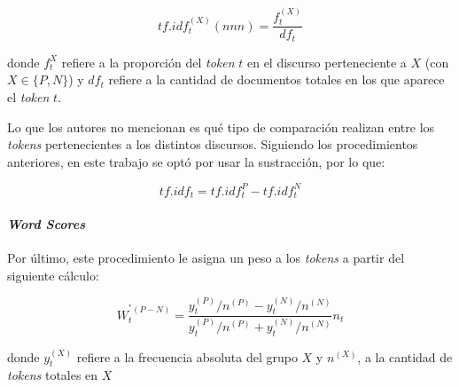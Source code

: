 \begin{equation}
\label{equation-tfidf-nnn}
    tf.idf_{t}^{(X)}(nnn) = \frac{f_{t}^{(X)}}{df_{t}}
\end{equation}

donde $f_{t}^{X}$ refiere a la proporci\'on del \textit{token} $t$
en el discurso perteneciente a $X$
(con $X \in \lbrace P,N \rbrace$) y $df_t$ refiere a la cantidad
de documentos totales en los que aparece el \textit{token} $t$.
\par
Lo que los autores no mencionan es qu\'e tipo de comparaci\'on realizan
entre los \textit{tokens} pertenecientes a los distintos discursos.
Siguiendo los procedimientos anteriores, en este trabajo se opt\'o por usar
la sustracci\'on, por lo que:

\begin{equation*}
    tf.idf_{t} = tf.idf_{t}^{P}-tf.idf_{t}^{N}
\end{equation*}

\paragraph{\textit{Word Scores}}
\label{paragraph-methods-wordscores}
Por \'ultimo, este procedimiento le asigna un peso a los \textit{tokens}
a partir del siguiente c\'alculo:

\begin{equation*}
    W_{t}^{^*(P-N)} = \frac{
        y_{t}^{(P)}/n^{(P)}-y_{t}^{(N)}/n^{(N)}
        }{
            y_{t}^{(P)}/n^{(P)}+y_{t}^{(N)}/n^{(N)}
        }n_{t}
\end{equation*}

donde $y_{t}^{(X)}$ refiere a la frecuencia absoluta
del grupo $X$ y $n^{(X)}$, a la cantidad de \textit{tokens} totales en $X$
